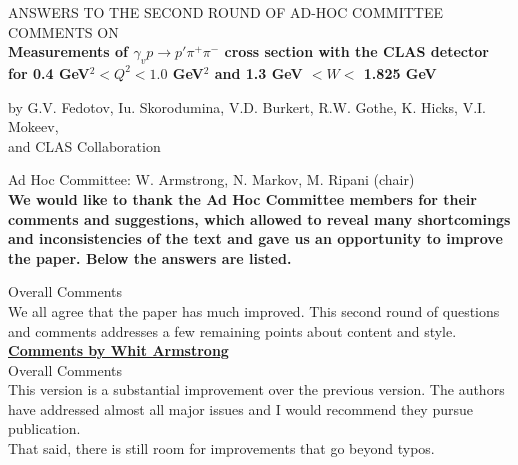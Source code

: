 \documentclass[,superscriptaddress,showpacs,amssymb,amsmath,amsfonts,linenumbers,article]{revtex4-1}
\begin{document}
\begin{center}
\vspace{2cm}
{\Large ANSWERS TO THE SECOND ROUND OF AD-HOC COMMITTEE COMMENTS ON}\\[0.7cm]  

{\bf \large
Measurements of $\gamma_{v} p \rightarrow p' \pi^{+} \pi^{-}$ cross section with the CLAS detector for 0.4 GeV$^2 < Q^2 < 1.0$ GeV$^2$ and 1.3 GeV $< W <$ 1.825 GeV \\[0.7cm]}

by G.V. Fedotov, Iu. Skorodumina, V.D. Burkert, R.W. Gothe, K. Hicks, V.I. Mokeev,\\ and CLAS Collaboration\\[0.5cm]
\end{center}


Ad Hoc Committee: W. Armstrong, N. Markov, M. Ripani (chair)\\[1.5cm] 


\vspace{1cm}
{\bf We would like to thank the Ad Hoc Committee members for their comments and suggestions, which allowed to reveal many shortcomings and inconsistencies of the text and gave us an opportunity to improve the paper. Below the answers are listed.}

\vspace{1cm}


Overall Comments\\[0.5cm]

We all agree that the paper has much improved. This second round of questions and comments
addresses a few remaining points about content and style.\\[0.5cm]







\vspace{1cm}
\underline{\bf Comments by Whit Armstrong}\\[1cm]

Overall Comments\\[0.5cm]


This version is a substantial improvement over the previous version. The authors have addressed
almost all major issues and I would recommend they pursue publication.\\[0.5cm]


That said, there is still room for improvements that go beyond typos.\\[0.5cm]
\end{document}
